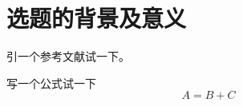 \documentclass[twoside]{Style/ucasthesis}%
\author{石宇奇}
\institute{北京鸟巢}
\date{2026 年\ 3 月}
\begin{document}
\pagestyle{plain}

\frontmatter
{}
\maketitle %




\section{选题的背景及意义}
引一个参考文献试一下\citep{udell2019bigdata_rank}。

写一个公式试一下
\begin{equation}
    A = B + C
\end{equation}




\intotoc*{\cleardoublepage}{\bibname}%
\end{document}
